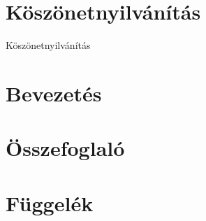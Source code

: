 \documentclass[12pt]{report}
\begin{document}
	
	
	
	
	\chapter*{Köszönetnyilvánítás}
	Köszönetnyilvánítás
	
	\tableofcontents
	
	\chapter{Bevezetés}
	
	

	
	
	\chapter{Összefoglaló}

	
	
	\printbibliography[
	heading=bibnumbered, title={Irodalomjegyzék}]
	
	\chapter{Függelék}
	
	
	
\end{document}
